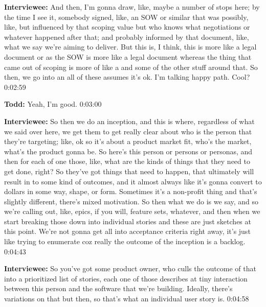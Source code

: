 \textbf{Interviewee:}   And then, I'm gonna draw, like, maybe a number of stops here; by the time I see it, somebody signed, like, an SOW or similar that was possibly, like, but influenced by that scoping value but who knows what negotiations or whatever happened after that; and probably informed by that document, like, what we say we're aiming to deliver.  But this is, I think, this is more like a legal document or as the SOW is more like a legal document whereas the thing that came out of scoping is more of like a  and some of the other stuff around that.  So then, we go into an all of these assumes it's ok.  I'm talking happy path.  Cool?  0:02:59

\textbf{Todd:}  	Yeah, I'm good.  0:03:00

\textbf{Interviewee:}  	So then we do an inception, and this is where, regardless of what we said over here, we get them to get really clear about who is the person that they're targeting; like, ok so it's about a product market fit, who's the market, what's the product gonna be.  So here's this person or persons or personas, and then for each of one those, like, what are the kinds of things that they need to get done, right?  So they've got things that need to happen, that ultimately will result in to some kind of outcomes, and it almost always like it's gonna convert to dollars in some way, shape, or form.  Sometimes it's a non-profit thing and that's slightly different, there's mixed motivation.  So then what we do is we say,  and so we're calling out, like, epics, if you will, feature sets, whatever, and then when we start breaking those down into individual stories and these are just sketches at this point.  We're not gonna get all into acceptance criteria right away, it's just like trying to enumerate coz really the outcome of the inception is a backlog. 0:04:43

\textbf{Interviewee:} So you've got some product owner, who culls the outcome of that into a prioritized list of stories, each one of those describes at tiny interaction between this person and the software that we're building.  Ideally, there's variations on that but then, so that's what an individual user story is.  0:04:58

